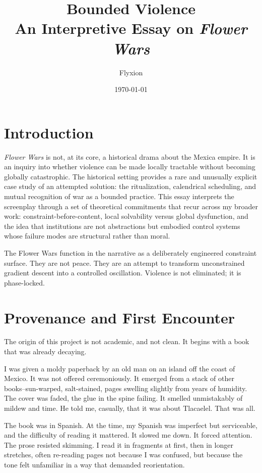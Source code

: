 \documentclass[12pt]{article}
\title{\textbf{Bounded Violence}\\
\large An Interpretive Essay on \textit{Flower Wars}}
\author{Flyxion}
\date{\today}
\begin{document}
\maketitle

\section*{Introduction}

\textit{Flower Wars} is not, at its core, a historical drama about the Mexica empire. It is an inquiry into whether violence can be made locally tractable without becoming globally catastrophic. The historical setting provides a rare and unusually explicit case study of an attempted solution: the ritualization, calendrical scheduling, and mutual recognition of war as a bounded practice. This essay interprets the screenplay through a set of theoretical commitments that recur across my broader work: constraint-before-content, local solvability versus global dysfunction, and the idea that institutions are not abstractions but embodied control systems whose failure modes are structural rather than moral.

The Flower Wars function in the narrative as a deliberately engineered constraint surface. They are not peace. They are an attempt to transform unconstrained gradient descent into a controlled oscillation. Violence is not eliminated; it is phase-locked.

\section*{Provenance and First Encounter}

The origin of this project is not academic, and not clean. It begins with a book that was already decaying.

I was given a moldy paperback by an old man on an island off the coast of Mexico. It was not offered ceremoniously. It emerged from a stack of other books--sun-warped, salt-stained, pages swelling slightly from years of humidity. The cover was faded, the glue in the spine failing. It smelled unmistakably of mildew and time. He told me, casually, that it was about Tlacaelel. That was all.

The book was in Spanish. At the time, my Spanish was imperfect but serviceable, and the difficulty of reading it mattered. It slowed me down. It forced attention. The prose resisted skimming. I read it in fragments at first, then in longer stretches, often re-reading pages not because I was confused, but because the tone felt unfamiliar in a way that demanded reorientation.
\end{document}
